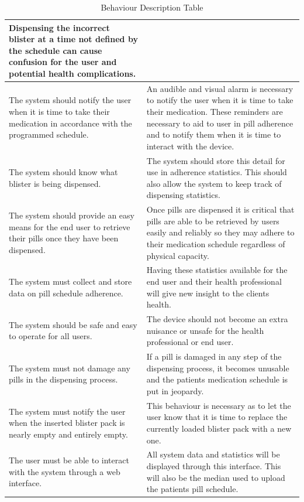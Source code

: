 \documentclass[12pt,titlepage]{article}
\begin{document}
\begin{table}[ht!]
\begin{center}
\begin{adjustbox}{max width=\textwidth}
\begin{tabular}{|p{}|p{}|}
 Dispensing the incorrect blister at a time not defined by the schedule can cause confusion for the user and potential health complications.\\
 \hline
 The system should notify the user when it is time to take their medication in accordance with the programmed schedule.
   &  An audible and visual alarm is necessary to notify the user when it is time to take their medication. These reminders are necessary to aid to user in pill adherence and to notify them when it is time to interact with the device.
 \\
 \hline
 The system should know what blister is being dispensed. &
 The system should store this detail for use in adherence statistics. This should also allow the system to keep track of dispensing statistics.\\
  \hline
 The system should provide an easy means for the end user to retrieve their pills once they have been dispensed.
  & Once pills are dispensed it is critical that pills are able to be retrieved by users easily and reliably so they may adhere to their medication schedule regardless of physical capacity.
 \\
 \hline
 The system must collect and store data on pill schedule adherence. & 
 Having these statistics available for the end user and their health professional will give new insight to the clients health.\\
 \hline
 The system should be safe and easy to operate for all users. &
 The device should not become an extra nuisance or unsafe for the health professional or end user. \\
 \hline
 The system must not damage any pills in the dispensing process. &
 If a pill is damaged in any step of the dispensing process, it becomes unusable and the patients medication schedule is put in jeopardy.\\
 \hline
  The system must notify the user when the inserted blister pack is nearly empty and entirely empty. & This behaviour is necessary as to let the user know that it is time to replace the currently loaded blister pack with a new one.
 \\
 \hline
 The user must be able to interact with the system through a web interface. &
 All system data and statistics will be displayed through this interface. This will also be the median used to upload the patients pill schedule. \\
 \hline
 
\end{tabular}
\end{adjustbox}
\end{center}
\caption{Behaviour Description Table}
\end{table}
\end{document}
